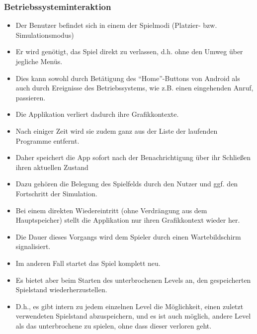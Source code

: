 \subsubsection{Betriebssysteminteraktion}
\begin{itemize}
\item Der Benutzer befindet sich in einem der Spielmodi (Platzier- bzw. 
Simulationsmodus)
\item Er wird genötigt, das Spiel direkt zu verlassen, d.h. ohne den Umweg über jegliche Menüs.
\item Dies kann sowohl durch Betätigung des "`Home"'-Buttons von Android als auch durch
Ereignisse des Betriebssystems, wie z.B. einen eingehenden Anruf, passieren.
\item Die Applikation verliert dadurch ihre Grafikkontexte.
\item Nach einiger Zeit wird sie zudem ganz aus der Liste der laufenden Programme entfernt.
\item Daher speichert die App sofort nach der Benachrichtigung über ihr Schließen ihren aktuellen Zustand
\item Dazu gehören die Belegung des Spielfelds durch den Nutzer und ggf. den Fortschritt der Simulation.
\item Bei einem direkten Wiedereintritt (ohne Verdrängung aus dem Hauptspeicher) stellt die Applikation nur ihren Grafikkontext wieder her.
\item Die Dauer dieses Vorgangs wird dem Spieler durch einen Wartebildschirm signalisiert.
\item Im anderen Fall startet das Spiel komplett neu.
\item Es bietet aber beim Starten des unterbrochenen Levels an, den gespeicherten Spielstand wiederherzustellen. 
\item D.h., es gibt intern zu jedem einzelnen Level die Möglichkeit,
einen zuletzt verwendeten Spielstand abzuspeichern, und es ist auch möglich, andere Level als das
unterbrochene zu spielen, ohne dass dieser verloren geht.
\end{itemize}
